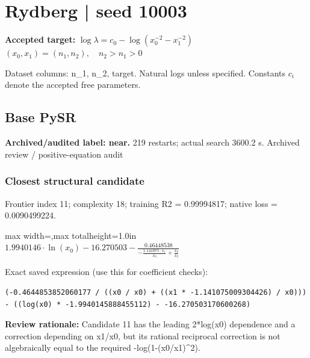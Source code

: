 \documentclass[10pt,letterpaper,landscape]{article}
\begin{document}
\section*{Rydberg | seed 10003}
\textbf{Accepted target:} $\displaystyle \log\lambda=c_0-\log\!\left(x_0^{-2}-x_1^{-2}\right)$\hfill $(x_0,x_1)=(n_1,n_2),\quad n_2>n_1>0$\par
{\small Dataset columns: n\_1, n\_2, target. Natural logs unless specified. Constants $c_i$ denote the accepted free parameters.}\par\medskip
\begin{minipage}[t]{0.485\textwidth}
\subsection*{Base PySR}
\textbf{Archived/audited label: near.} 219 restarts; actual search 3600.2 s.
{\small Archived review / positive-equation audit}
\subsubsection*{Closest structural candidate}
Frontier index 11; complexity 18; training R2 = 0.99994817; native loss = 0.0090499224.
\begin{center}\begin{adjustbox}{max width=\linewidth,max totalheight=1.0in}$\displaystyle 1.9940146 \cdot \ln{\left(x_{0} \right)} - 16.270503 - \frac{0.46448538}{- \frac{1.141075 \cdot x_{1}}{x_{0}} + \frac{x_{0}}{x_{0}}}$\end{adjustbox}\end{center}
{\scriptsize Exact saved expression (use this for coefficient checks):}
\begin{lstlisting}
(-0.4644853852060177 / ((x0 / x0) + ((x1 * -1.141075009304426) / x0))) - ((log(x0) * -1.9940145888455112) - -16.270503170600268)
\end{lstlisting}
{\small\textbf{Review rationale:} Candidate 11 has the leading 2*log(x0) dependence and a correction depending on x1/x0, but its rational reciprocal correction is not algebraically equal to the required -log(1-(x0/x1)\textasciicircum{}2).}

\end{minipage}
\end{document}
